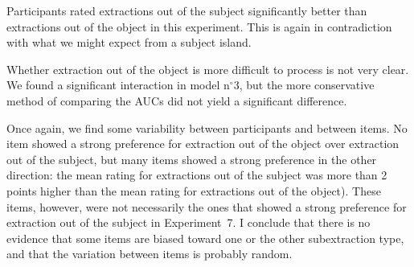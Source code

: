 Participants rated extractions out of the subject significantly better than extractions out of the object in this experiment. This is again in contradiction with what we might expect from a subject island. 

Whether extraction out of the object is more difficult to process is not very clear. We found a significant interaction in model n$^{\circ}$3, but the more conservative method of comparing the AUCs did not yield a significant difference. 

Once again, we find some variability between participants and between items. No item showed a strong preference for extraction out of the object over extraction out of the subject, but many items showed a strong preference in the other direction: the mean rating for extractions out of the subject was more than 2 points higher than the mean rating for extractions out of the object). These items, however, were not necessarily the ones that showed a strong preference for extraction out of the subject in Experiment~7. I conclude that there is no evidence that some items are biased toward one or the other subextraction type, and that the variation between items is probably random. 
